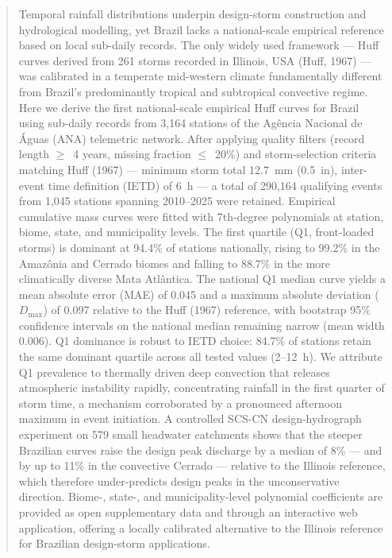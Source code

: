 \documentclass[a4paper,fleqn]{cas-sc}
\begin{document}
\begin{abstract}
Temporal rainfall distributions underpin design-storm construction and
hydrological modelling, yet Brazil lacks a national-scale empirical
reference based on local sub-daily records. The only widely used
framework — Huff curves derived from 261 storms recorded in Illinois,
USA (Huff, 1967) — was calibrated in a temperate mid-western climate
fundamentally different from Brazil's predominantly tropical and
subtropical convective regime. Here we derive the first national-scale
empirical Huff curves for Brazil using sub-daily records from 3,164
stations of the Agência Nacional de Águas (ANA) telemetric network.
After applying quality filters (record length $\geq$~4 years, missing
fraction $\leq$~20\%) and storm-selection criteria matching Huff
(1967) — minimum storm total 12.7~mm (0.5~in), inter-event time
definition (IETD) of 6~h — a total of 290,164 qualifying events from
1,045 stations spanning 2010–2025 were retained. Empirical cumulative
mass curves were fitted with 7th-degree polynomials at station,
biome, state, and municipality levels. The first quartile (Q1,
front-loaded storms) is dominant at 94.4\% of stations nationally,
rising to 99.2\% in the Amazônia and Cerrado biomes and falling to
88.7\% in the more climatically diverse Mata Atlântica. The national
Q1 median curve yields a mean absolute error (MAE) of 0.045 and a
maximum absolute deviation ($D_\mathrm{max}$) of 0.097 relative to
the Huff (1967) reference, with bootstrap 95\% confidence intervals
on the national median remaining narrow (mean width 0.006). Q1
dominance is robust to IETD choice: 84.7\% of stations retain the
same dominant quartile across all tested values (2–12~h). We attribute
Q1 prevalence to thermally driven deep convection that releases
atmospheric instability rapidly, concentrating rainfall in the first
quarter of storm time, a mechanism corroborated by a pronounced
afternoon maximum in event initiation. A controlled SCS-CN
design-hydrograph experiment on 579 small headwater catchments shows
that the steeper Brazilian curves raise the design peak discharge by a
median of 8\% — and by up to 11\% in the convective Cerrado — relative
to the Illinois reference, which therefore under-predicts design peaks
in the unconservative direction. Biome-, state-, and municipality-level
polynomial coefficients are provided as open supplementary data and
through an interactive web application, offering a locally calibrated
alternative to the Illinois reference for Brazilian design-storm
applications.
\end{abstract}
\end{document}

